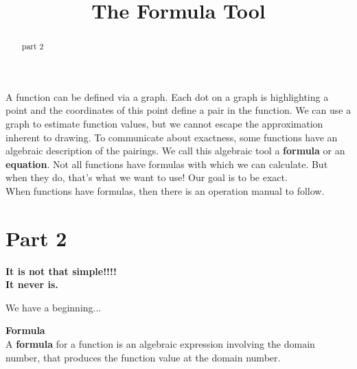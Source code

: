 \documentclass{ximera}
\title{The Formula Tool}
\begin{document}
\begin{abstract}
part 2
\end{abstract}
\maketitle



A function can be defined via a graph. Each dot on a graph is highlighting a point and the coordinates of this point define a pair in the function. We can use a graph to estimate function values, but we cannot escape the approximation inherent to drawing.  To communicate about exactness, some functions have an algebraic description of the pairings.  We call this algebraic tool a \textbf{formula} or an \textbf{equation}. Not all functions have formulas with which we can calculate.  But when they do, that's what we want to use!  Our goal is to be exact. \\


When functions have formulas, then there is an operation manual to follow. \\





\section*{Part 2}




\begin{center}

\textbf{\textcolor{red!80!black}{It is not that simple!!!!}} \\

\textbf{\textcolor{purple!85!blue}{It never is.}}
 
\end{center}





We have a beginning...\\

\begin{idea}  \textbf{\textcolor{green!50!black}{Formula}} \\ 

A \textbf{formula} for a function is an algebraic expression involving the domain number, that produces the function value at the domain number.
\end{idea}
\end{document}
